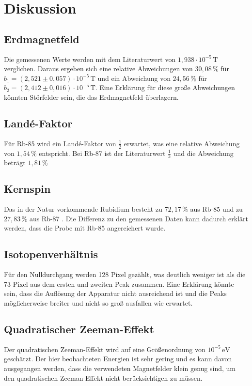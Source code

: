 \section{Diskussion}
\label{sec:Diskussion}

\subsection{Erdmagnetfeld}

Die gemessenen Werte werden mit dem Literaturwert von $1,938 \cdot 10^{-5} \, \unit{\tesla}$ \cite{Pfeiler2017} verglichen.
Daraus ergeben sich eine relative Abweichungen von $30,08 \, \%$ für $b_1 = \left( 2,521 \pm 0,057 \right) \cdot 10^{-5}\, \unit{\tesla}$ und ein 
Abweichung von $24,56 \, \% $ für $b_2 = \left( 2,412  \pm 0,016 \right) \cdot 10^{-5}\, \unit{\tesla}$.
Eine Erklärung für diese große Abweichungen könnten Störfelder sein, die das Erdmagnetfeld überlagern.\\


\subsection{Landé-Faktor}


Für Rb-85 wird ein Landé-Faktor von $\frac{1}{2} $ erwartet, was eine relative Abweichung von $1,54 \, \%$ entspricht.
Bei Rb-87 ist der Literaturwert $\frac{1}{3}$ und die Abweichung beträgt $1,81 \, \%$\\


\subsection{Kernspin}


Das in der Natur vorkommende Rubidium besteht zu $72,17 \, \%$ aus Rb-85 und zu $27,83 \, \%$ aus Rb-87 \cite{Pfeiler2017} .
Die Differenz zu den gemessenen Daten kann dadurch erklärt werden, dass die Probe mit Rb-85 angereichert wurde.\\


\subsection{Isotopenverhältnis}

Für den Nulldurchgang werden 128 Pixel gezählt, was deutlich weniger ist als die 73 Pixel aus dem ersten und zweiten Peak zusammen.
Eine Erklärung könnte sein, dass die Auflösung der Apparatur nicht ausreichend ist und die Peaks möglicherweise breiter und nicht so groß ausfallen wie erwartet.\\


\subsection{Quadratischer Zeeman-Effekt}

Der quadratischen Zeeman-Effekt wird auf eine Größenordnung von $10^{-5} \, \unit{\electronvolt}$ geschätzt.
Der hier beobachteten Energien ist sehr gering und es kann davon ausgegangen werden, dass
die verwendeten Magnetfelder klein genug sind, um den quadratischen Zeeman-Effekt nicht berücksichtigen zu müssen. 